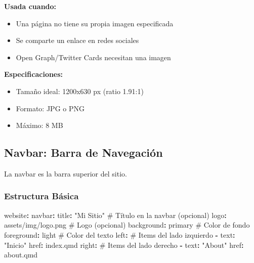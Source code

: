\documentclass[
  doc,
  floatsintext,
  longtable,
  a4paper,
  nolmodern,
  notxfonts,
  notimes,
  12pt,
  colorlinks=true,linkcolor=blue,citecolor=blue,urlcolor=blue]{apa7}
\newenvironment{Shaded}{\begin{snugshade}}{\end{snugshade}}
\newcommand{\AttributeTok}[1]{\textcolor[rgb]{0.40,0.45,0.13}{#1}}
\newcommand{\CommentTok}[1]{\textcolor[rgb]{0.37,0.37,0.37}{#1}}
\newcommand{\FunctionTok}[1]{\textcolor[rgb]{0.28,0.35,0.67}{#1}}
\newcommand{\KeywordTok}[1]{\textcolor[rgb]{0.00,0.23,0.31}{\textbf{#1}}}
\newcommand{\StringTok}[1]{\textcolor[rgb]{0.13,0.47,0.30}{#1}}
\providecommand{\tightlist}{%
  \setlength{\itemsep}{0pt}\setlength{\parskip}{0pt}}
\begin{document}
\textbf{Usada cuando:}

\begin{itemize}
\tightlist
\item
  Una página no tiene su propia imagen especificada
\item
  Se comparte un enlace en redes sociales
\item
  Open Graph/Twitter Cards necesitan una imagen
\end{itemize}

\textbf{Especificaciones:}

\begin{itemize}
\tightlist
\item
  Tamaño ideal: 1200x630 px (ratio 1.91:1)
\item
  Formato: JPG o PNG
\item
  Máximo: 8 MB
\end{itemize}

\subsection{Navbar: Barra de
Navegación}\label{navbar-barra-de-navegaciuxf3n}

La navbar es la barra superior del sitio.

\subsubsection{Estructura Básica}\label{estructura-buxe1sica}

\begin{Shaded}
\begin{Highlighting}[]
\FunctionTok{website}\KeywordTok{:}
\AttributeTok{  }\FunctionTok{navbar}\KeywordTok{:}
\AttributeTok{    }\FunctionTok{title}\KeywordTok{:}\AttributeTok{ }\StringTok{"Mi Sitio"}\CommentTok{           \# Título en la navbar (opcional)}
\AttributeTok{    }\FunctionTok{logo}\KeywordTok{:}\AttributeTok{ assets/img/logo.png}\CommentTok{   \# Logo (opcional)}
\AttributeTok{    }\FunctionTok{background}\KeywordTok{:}\AttributeTok{ primary}\CommentTok{         \# Color de fondo}
\AttributeTok{    }\FunctionTok{foreground}\KeywordTok{:}\AttributeTok{ light}\CommentTok{           \# Color del texto}
\AttributeTok{    }\FunctionTok{left}\KeywordTok{:}\CommentTok{                       \# Items del lado izquierdo}
\AttributeTok{      }\KeywordTok{{-}}\AttributeTok{ }\FunctionTok{text}\KeywordTok{:}\AttributeTok{ }\StringTok{"Inicio"}
\AttributeTok{        }\FunctionTok{href}\KeywordTok{:}\AttributeTok{ index.qmd}
\AttributeTok{    }\FunctionTok{right}\KeywordTok{:}\CommentTok{                      \# Items del lado derecho}
\AttributeTok{      }\KeywordTok{{-}}\AttributeTok{ }\FunctionTok{text}\KeywordTok{:}\AttributeTok{ }\StringTok{"About"}
\AttributeTok{        }\FunctionTok{href}\KeywordTok{:}\AttributeTok{ about.qmd}
\end{Highlighting}
\end{Shaded}
\end{document}
